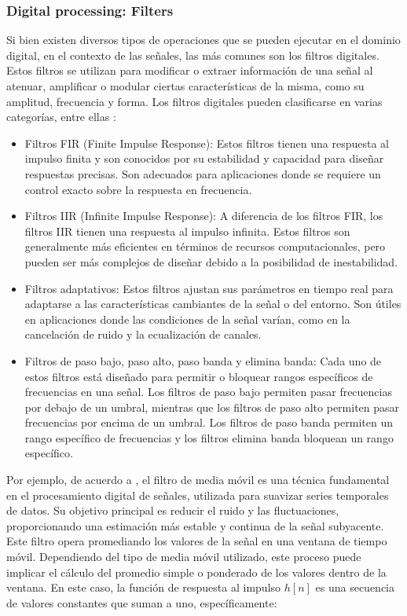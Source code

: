 \documentclass{report}
\begin{document}
\subsubsection{Digital processing: Filters}

\noindent Si bien existen diversos tipos de operaciones que se pueden ejecutar en el dominio digital, en el contexto de las señales, las más comunes son los filtros digitales. Estos filtros se utilizan para modificar o extraer información de una señal al atenuar, amplificar o modular ciertas características de la misma, como su amplitud, frecuencia y forma. Los filtros digitales pueden clasificarse en varias categorías, entre ellas \cite{proakis2}:

\begin{itemize}
    \item Filtros FIR (Finite Impulse Response): Estos filtros tienen una respuesta al impulso finita y son conocidos por su estabilidad y capacidad para diseñar respuestas precisas. Son adecuados para aplicaciones donde se requiere un control exacto sobre la respuesta en frecuencia.
    \item Filtros IIR (Infinite Impulse Response): A diferencia de los filtros FIR, los filtros IIR tienen una respuesta al impulso infinita. Estos filtros son generalmente más eficientes en términos de recursos computacionales, pero pueden ser más complejos de diseñar debido a la posibilidad de inestabilidad.
    \item Filtros adaptativos: Estos filtros ajustan sus parámetros en tiempo real para adaptarse a las características cambiantes de la señal o del entorno. Son útiles en aplicaciones donde las condiciones de la señal varían, como en la cancelación de ruido y la ecualización de canales.
    \item  Filtros de paso bajo, paso alto, paso banda y elimina banda: Cada uno de estos filtros está diseñado para permitir o bloquear rangos específicos de frecuencias en una señal. Los filtros de paso bajo permiten pasar frecuencias por debajo de un umbral, mientras que los filtros de paso alto permiten pasar frecuencias por encima de un umbral. Los filtros de paso banda permiten un rango específico de frecuencias y los filtros elimina banda bloquean un rango específico.
\end{itemize}

\noindent Por ejemplo, de acuerdo a \cite{proakis3}, el filtro de media móvil es una técnica fundamental en el procesamiento digital de señales, utilizada para suavizar series temporales de datos. Su objetivo principal es reducir el ruido y las fluctuaciones, proporcionando una estimación más estable y continua de la señal subyacente. Este filtro opera promediando los valores de la señal en una ventana de tiempo móvil. Dependiendo del tipo de media móvil utilizado, este proceso puede implicar el cálculo del promedio simple o ponderado de los valores dentro de la ventana. En este caso, la función de respuesta al impulso \( h[n] \) es una secuencia de valores constantes que suman a uno, específicamente:
\end{document}
